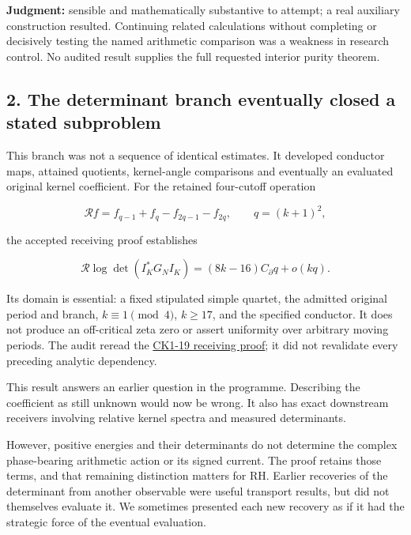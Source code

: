 \documentclass[
  british,
  11pt,
  a4paper,
]{article}
\begin{document}
\textbf{Judgment:} sensible and mathematically substantive to attempt; a
real auxiliary construction resulted. Continuing related calculations
without completing or decisively testing the named arithmetic comparison
was a weakness in research control. No audited result supplies the full
requested interior purity theorem.

\subsection{2. The determinant branch eventually closed a stated
subproblem}\label{the-determinant-branch-eventually-closed-a-stated-subproblem}

This branch was not a sequence of identical estimates. It developed
conductor maps, attained quotients, kernel-angle comparisons and
eventually an evaluated original kernel coefficient. For the retained
four-cutoff operation

\[\mathcal Rf=f_{q-1}+f_q-f_{2q-1}-f_{2q},\qquad q=(k+1)^2,\]

the accepted receiving proof establishes

\[\mathcal R\log\det(I_K^*G_NI_K)=(8k-16)C_\partial q+o(kq).\]

Its domain is essential: a fixed stipulated simple quartet, the admitted
original period and branch, \(k\equiv1\pmod4\), \(k\ge17\), and the
specified conductor. It does not produce an off-critical zeta zero or
assert uniformity over arbitrary moving periods. The audit reread the
\href{https://github.com/KokunoYumeto/zeta-function-research-reader/blob/1447462732b40b1474bd9a819cf79257f5326ada/workbenches/splitzero-tandem/continuations/20260922-kernel-frequency/COMBINED_KERNEL_AND_RECEIVERS.md\#L148}{CK1-19
receiving proof}; it did not revalidate every preceding analytic
dependency.

This result answers an earlier question in the programme. Describing the
coefficient as still unknown would now be wrong. It also has exact
downstream receivers involving relative kernel spectra and measured
determinants.

However, positive energies and their determinants do not determine the
complex phase-bearing arithmetic action or its signed current. The proof
retains those terms, and that remaining distinction matters for RH.
Earlier recoveries of the determinant from another observable were
useful transport results, but did not themselves evaluate it. We
sometimes presented each new recovery as if it had the strategic force
of the eventual evaluation.
\end{document}
